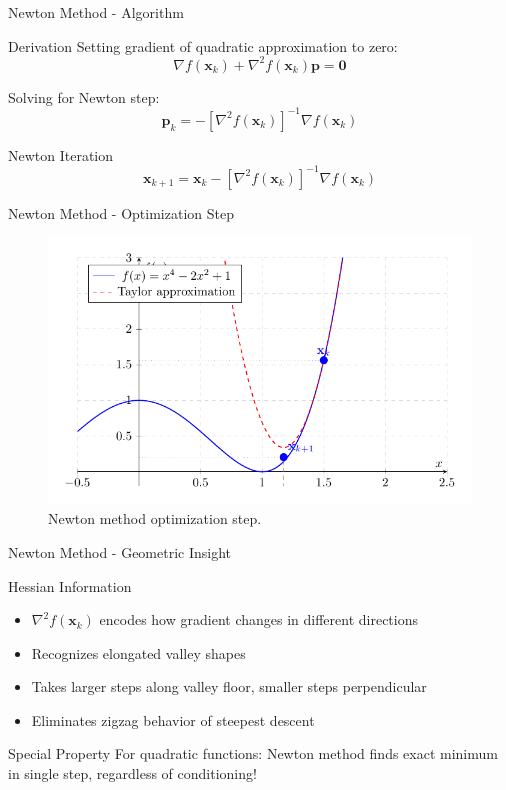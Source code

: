 \documentclass[aspectratio=1610]{beamer}
\begin{document}
\begin{frame}{Newton Method - Algorithm}
  \begin{block}{Derivation}
    Setting gradient of quadratic approximation to zero:
    $$\nabla f(\mathbf{x}_k) + \nabla^2 f(\mathbf{x}_k)\mathbf{p} = \mathbf{0}$$
    
    Solving for Newton step:
    $$\mathbf{p}_k = -[\nabla^2 f(\mathbf{x}_k)]^{-1}\nabla f(\mathbf{x}_k)$$
  \end{block}
  
  \vspace{0.5cm}
  \begin{block}{Newton Iteration}
    $$\mathbf{x}_{k+1} = \mathbf{x}_k - [\nabla^2 f(\mathbf{x}_k)]^{-1}\nabla f(\mathbf{x}_k)$$
  \end{block}
\end{frame}

\begin{frame}{Newton Method - Optimization Step}
    \begin{figure}[h]
    \centering
      \includegraphics[height=0.8\textheight]{figures/newton_step.pdf}
    \caption{Newton method optimization step.}
  \end{figure}
\end{frame}

\begin{frame}{Newton Method - Geometric Insight}
  \begin{block}{Hessian Information}
    \begin{itemize}
      \item $\nabla^2 f(\mathbf{x}_k)$ encodes how gradient changes in different directions
      \item Recognizes elongated valley shapes
      \item Takes larger steps along valley floor, smaller steps perpendicular
      \item Eliminates zigzag behavior of steepest descent
    \end{itemize}
  \end{block}
  
  \vspace{0.5cm}
  \begin{block}{Special Property}
    For quadratic functions: Newton method finds exact minimum in single step, regardless of conditioning!
  \end{block}
\end{frame}
\end{document}
